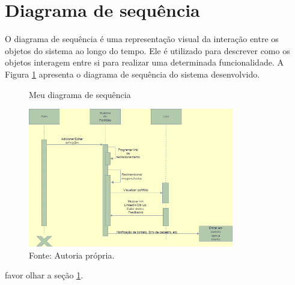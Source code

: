 \section{Diagrama de sequência}
\label{sec:sequencia}   
O diagrama de sequência é uma representação visual da interação entre os objetos do sistema ao longo do tempo. Ele é utilizado para descrever como os objetos interagem entre si para realizar uma determinada funcionalidade. A Figura \ref{fig:Diagrama_de_sequencia} apresenta o diagrama de sequência do sistema desenvolvido. 
\begin{figure} [h!] 
    \centering
    \caption{Meu diagrama de sequência}
    \includegraphics[width=0.8\textwidth]{Figures/Diagrama_de_sequencia.png}
    \caption*{Fonte: Autoria própria.}
    \label{fig:Diagrama_de_sequencia}
\end{figure}

favor olhar a seção \ref{sec:sequencia}.




